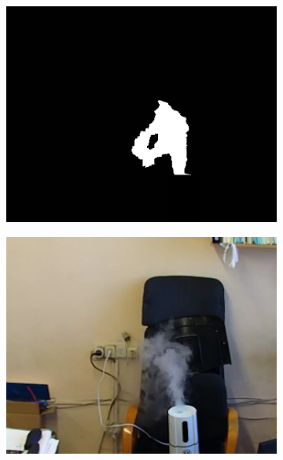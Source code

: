 \documentclass[14pt, a4paper]{extreport}
\begin{document}
\begin{figure}[h!]
\begin{subfigure}{.32\textwidth}
		\end{subfigure}
		\begin{subfigure}{.32\textwidth}
			\centering
			\includegraphics[width = \textwidth]{image/chapter_3/examples/mask/206}
		\end{subfigure}
		\begin{subfigure}{.32\textwidth}
			\centering
			\includegraphics[width = \textwidth]{image/chapter_3/examples/img/185}
		\end{subfigure}
		\begin{subfigure}{.32\textwidth}

\end{subfigure}
\end{figure}
\end{document}
